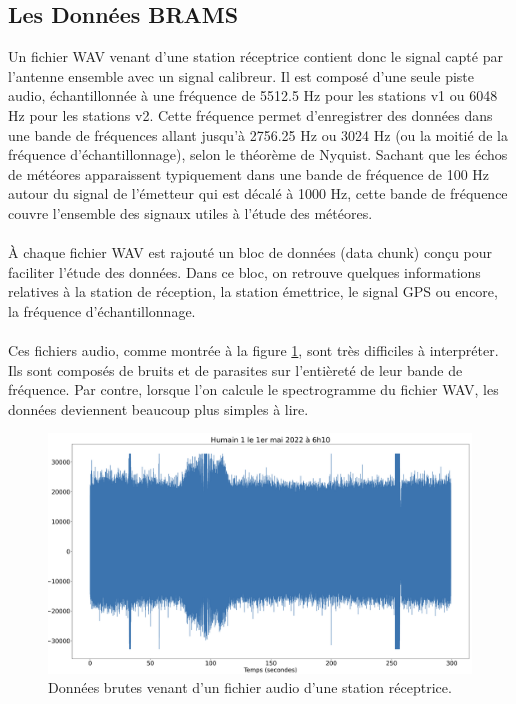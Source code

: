 \documentclass[11pt]{article}
\begin{document}


\subsection{Les Données BRAMS}


Un fichier WAV venant d'une station réceptrice contient donc le signal capté par l'antenne ensemble avec un signal calibreur.
Il est composé d'une seule piste audio, échantillonnée à une fréquence de 5512.5 Hz pour les stations v1 ou 6048 Hz pour les stations v2.
Cette fréquence permet d'enregistrer des données dans une bande de fréquences allant jusqu'à 2756.25 Hz ou 3024 Hz (ou la moitié de la fréquence d'échantillonnage), selon le théorème de Nyquist.
Sachant que les échos de météores apparaissent typiquement dans une bande de fréquence de 100 Hz autour du signal de l'émetteur qui est décalé à 1000 Hz, cette bande de fréquence couvre l'ensemble des signaux utiles à l'étude des météores.\\
\\
À chaque fichier WAV est rajouté un bloc de données (data chunk) conçu pour faciliter l'étude des données.
Dans ce bloc, on retrouve quelques informations relatives à la station de réception, la station émettrice, le signal GPS ou encore, la fréquence d'échantillonnage.\\
\\
Ces fichiers audio, comme montrée à la figure \ref{fig:wav_brut}, sont très difficiles à interpréter.
Ils sont composés de bruits et de parasites sur l'entièreté de leur bande de fréquence.
Par contre, lorsque l'on calcule le spectrogramme du fichier WAV, les données deviennent beaucoup plus simples à lire.
\begin{figure}[t]
    \begin{center}
        \includegraphics[scale=0.155]{wav_brut.png}
        \caption{Données brutes venant d'un fichier audio d'une station réceptrice.}
        \label{fig:wav_brut}
    \end{center}
\end{figure}
\end{document}
